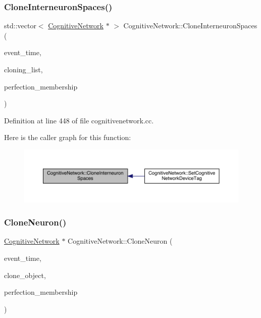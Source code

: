 \subsubsection{\texorpdfstring{Clone\+Interneuron\+Spaces()}{CloneInterneuronSpaces()}}
{\footnotesize\ttfamily std\+::vector$<$ \hyperlink{class_cognitive_network}{Cognitive\+Network} $\ast$ $>$ Cognitive\+Network\+::\+Clone\+Interneuron\+Spaces (\begin{DoxyParamCaption}\item[{std\+::chrono\+::time\+\_\+point$<$ \hyperlink{universe_8h_a0ef8d951d1ca5ab3cfaf7ab4c7a6fd80}{Clock} $>$}]{event\+\_\+time,  }\item[{std\+::vector$<$ \hyperlink{class_cognitive_network}{Cognitive\+Network} $\ast$$>$}]{cloning\+\_\+list,  }\item[{double}]{perfection\+\_\+membership }\end{DoxyParamCaption})}



Definition at line 448 of file cognitivenetwork.\+cc.

Here is the caller graph for this function\+:
\nopagebreak
\begin{figure}[H]
\begin{center}
\leavevmode
\includegraphics[width=350pt]{class_cognitive_network_a5ee1d7b6df5bfe0048b4aea317c1974c_icgraph}
\end{center}
\end{figure}
\mbox{\label{class_cognitive_network_abf42d64965d64836d6fcbd7ce33c8db4}} 
\subsubsection{\texorpdfstring{Clone\+Neuron()}{CloneNeuron()}}
{\footnotesize\ttfamily \hyperlink{class_cognitive_network}{Cognitive\+Network} $\ast$ Cognitive\+Network\+::\+Clone\+Neuron (\begin{DoxyParamCaption}\item[{std\+::chrono\+::time\+\_\+point$<$ \hyperlink{universe_8h_a0ef8d951d1ca5ab3cfaf7ab4c7a6fd80}{Clock} $>$}]{event\+\_\+time,  }\item[{\hyperlink{class_cognitive_network}{Cognitive\+Network} $\ast$}]{clone\+\_\+object,  }\item[{double}]{perfection\+\_\+membership }\end{DoxyParamCaption})}




